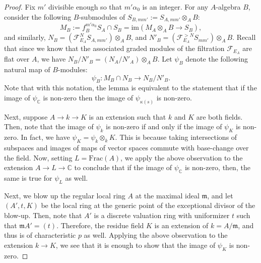 \documentclass[10pt,a4paper]{amsart}
\newcommand{\C}{\mathbb{C}}
\newcommand{\cF}{\mathcal{F}}
\newcommand{\fm}{\mathfrak{m}}
\begin{document}
\begin{proof}
    Fix $m'$ divisible enough so that $m' \alpha_0$ is an integer. For any $A$-algebra $B$,  consider the following $B$-submodules of $ S_{B, mm'} := S_{A, mm'} \otimes_A B$:
    \[ M_B := f_B ^{m' \alpha_0} S_A \cap S_B = \text{im} (M_A \otimes_A B \to S_B),\]
    and similarly,
    $N_B = (\cF ^{N } _{E_A} S_{A, mm'}) \otimes _A B$, and $N'_B = (\cF _{E_A} ^{> N } S_{mm'}) \otimes_A B$. Recall that since we know that the associated graded modules of the filtration $\cF_{E_A}$ are flat over $A$, we have $N_B/N'_B = (N_A/N'_A) \otimes_A B$. Let $\psi_B$ denote the following natural map of $B$-modules:
    \[ \psi_B: M_B \cap N_B \to N_B/N'_ B. \]
    Note that with this notation, the lemma is equivalent to the statement that if the image of $\psi_ \C$ is non-zero then the image of $\psi _{\kappa(s)}$ is non-zero.

    Next, suppose $A \to k \to K$ is an extension such that $k$ and $K$ are both fields. Then, note that the image of $\psi_k$ is non-zero if and only if the image of $\psi_K$ is non-zero. In fact, we have $\psi_K = \psi_k \otimes _k K$. This is because taking intersections of subspaces and images of maps of vector spaces commute with base-change over the field. Now, setting $L = \text{Frac}(A)$, we apply the above observation to the extension $A \to L \to \C$ to conclude that if the image of $\psi_\C$ is non-zero, then, the same is true for $\psi_L$ as well.
    
    Next, we blow up the regular local ring $A$ at the maximal ideal $\fm$, and let $(A', t, K)$ be the local ring at the generic point of the exceptional divisor of the blow-up. Then, note that $A'$ is a discrete valuation ring with uniformizer $t$ such that $\fm A' = (t)$. Therefore, the residue field $K$ is an extension of $k = A/\fm$, and thus is of characteristic $p$ as well. Applying the above observation to the extension $k \to K$, we see that it is enough to show that the image of $\psi_K$ is non-zero.


\end{proof}
\end{document}
